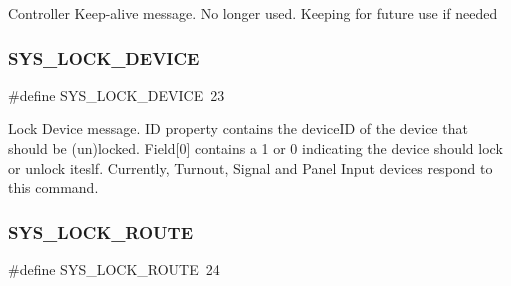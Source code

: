 Controller Keep-\/alive message. No longer used. Keeping for future use if needed \mbox{\label{group___u_d_p_message_i_d_ga42644954a92421cfe92c2e3d20f795ce}} 
\subsubsection{\texorpdfstring{S\+Y\+S\+\_\+\+L\+O\+C\+K\+\_\+\+D\+E\+V\+I\+CE}{SYS\_LOCK\_DEVICE}}
{\footnotesize\ttfamily \#define S\+Y\+S\+\_\+\+L\+O\+C\+K\+\_\+\+D\+E\+V\+I\+CE~23}

Lock Device message. ID property contains the device\+ID of the device that should be (un)locked. Field\mbox{[}0\mbox{]} contains a 1 or 0 indicating the device should lock or unlock iteslf. Currently, Turnout, Signal and Panel Input devices respond to this command. \mbox{\label{group___u_d_p_message_i_d_ga9ba07526db57f9ec44d01fe3eba9cc60}} 
\subsubsection{\texorpdfstring{S\+Y\+S\+\_\+\+L\+O\+C\+K\+\_\+\+R\+O\+U\+TE}{SYS\_LOCK\_ROUTE}}
{\footnotesize\ttfamily \#define S\+Y\+S\+\_\+\+L\+O\+C\+K\+\_\+\+R\+O\+U\+TE~24}

